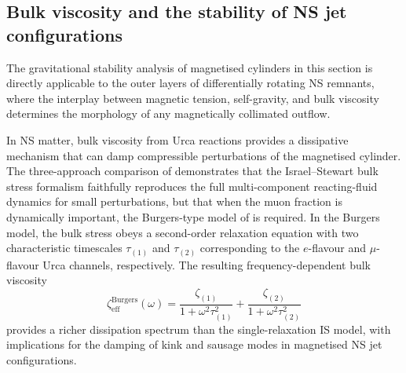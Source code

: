 \subsection*{Bulk viscosity and the stability of NS jet
  configurations}
\label{sec:rel-12-110-bulk}

The gravitational stability analysis of magnetised cylinders in this
section is directly applicable to the outer layers of differentially
rotating NS remnants, where the interplay between magnetic tension,
self-gravity, and bulk viscosity determines the morphology of any
magnetically collimated outflow.

In NS matter, bulk viscosity from Urca reactions provides a dissipative
mechanism that can damp compressible perturbations of the magnetised
cylinder.  The three-approach comparison of
\citet{CamelioGavassinoBulkI2022,CamelioGavassinoBulkII2022}
demonstrates that the Israel--Stewart bulk stress formalism faithfully
reproduces the full multi-component reacting-fluid dynamics for small
perturbations, but that when the muon fraction is dynamically important,
the Burgers-type model of \citet{GavassinoBurgers2023} is required.
In the Burgers model, the bulk stress obeys a second-order relaxation
equation with two characteristic timescales $\tau_{(1)}$ and
$\tau_{(2)}$ corresponding to the $e$-flavour and $\mu$-flavour Urca
channels, respectively.  The resulting frequency-dependent bulk viscosity
\begin{equation}
\label{eq:rel-12-zeta-Burgers}
\zeta_{\mathrm{eff}}^{\mathrm{Burgers}}(\omega) =
  \frac{\zeta_{(1)}}{1+\omega^{2}\tau_{(1)}^{2}}
  + \frac{\zeta_{(2)}}{1+\omega^{2}\tau_{(2)}^{2}}
\end{equation}
provides a richer dissipation spectrum than the single-relaxation IS
model, with implications for the damping of kink and sausage modes
in magnetised NS jet configurations.
